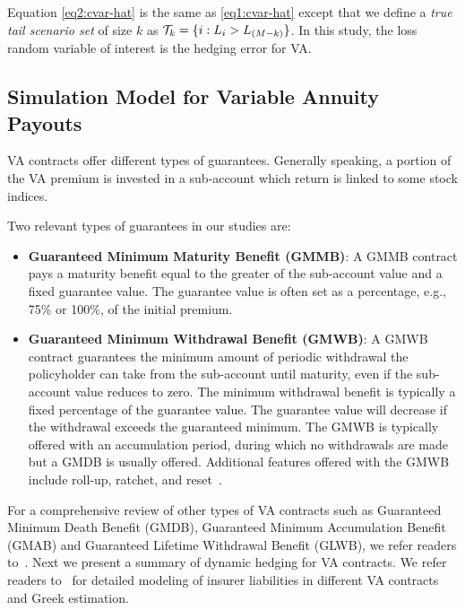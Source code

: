 Equation \eqref{eq2:cvar-hat} is the same as \eqref{eq1:cvar-hat} except that we define a \textit{true tail scenario set} of size $k$ as $\mathcal{T}_{k} = \{i: L_i > L_{(M-k)}\}$.
In this study, the loss random variable of interest is the hedging error for VA.

\subsection{Simulation Model for Variable Annuity Payouts}\label{subsec:VApayout}

VA contracts offer different types of guarantees.
Generally speaking, a portion of the VA premium is invested in a sub-account which return is linked to some stock indices.

Two relevant types of guarantees in our studies are:
\begin{itemize}[noitemsep]
    \item \textbf{Guaranteed Minimum Maturity Benefit (GMMB)}: A GMMB contract pays a maturity benefit equal to the greater of the sub-account value and a fixed guarantee value.
    The guarantee value is often set as a percentage, e.g., 75\% or 100\%, of the initial premium.

    \item \textbf{Guaranteed Minimum Withdrawal Benefit (GMWB)}: A GMWB contract guarantees the minimum amount of periodic withdrawal the policyholder can take from the sub-account until maturity, even if the sub-account value reduces to zero.
    The minimum withdrawal benefit is typically a fixed percentage of the guarantee value.
    The guarantee value will decrease if the withdrawal exceeds the guaranteed minimum. The GMWB is typically offered with an accumulation period, during which no withdrawals are made but a GMDB is usually offered. Additional features offered with the GMWB include roll-up, ratchet, and reset~\citep{geneva2013variable}.
\end{itemize}
For a comprehensive review of other types of VA contracts such as Guaranteed Minimum Death Benefit (GMDB), Guaranteed Minimum Accumulation Benefit (GMAB) and Guaranteed Lifetime Withdrawal Benefit (GLWB), we refer readers to~\cite{hardy2003investment}.
Next we present a summary of dynamic hedging for VA contracts.
We refer readers to~\cite{dang2021efficient} for detailed modeling of insurer liabilities in different VA contracts and Greek estimation.

